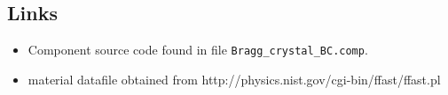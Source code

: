 \subsection*{Links}
\begin{itemize}
  \item Component source code found in file \texttt{Bragg\_crystal\_BC.comp}.
  \item material datafile obtained from http://physics.nist.gov/cgi-bin/ffast/ffast.pl
\end{itemize}
